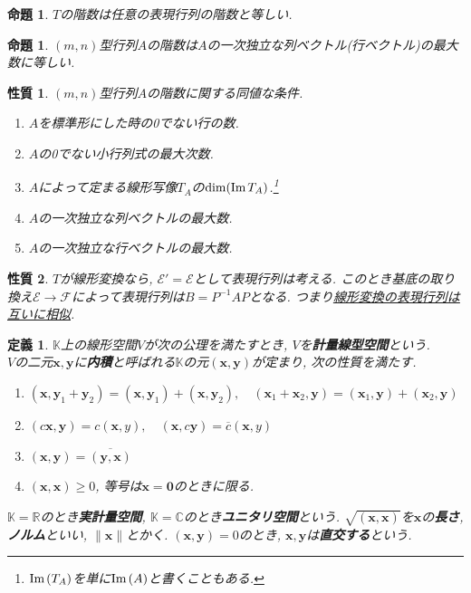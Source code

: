 \documentclass[a4j,dvipdfmx]{jsarticle}
\newcommand{\R}{\mathbb{R}}
\newcommand{\C}{\mathbb{C}}
\newcommand{\K}{\mathbb{K}}
\newcommand{\E}{\mathcal{E}}
\newcommand{\F}{\mathcal{F}}
\renewcommand{\Im}{\mathrm{Im}\hspace{0.5mm}}
\theoremstyle{mystyle}
\newtheorem*{definition}{定義}
\newtheorem{proposition}[theorem]{命題}
\newtheorem*{property}{性質}
\begin{document}
    \begin{proposition}
        $T$の階数は任意の表現行列の階数と等しい.
    \end{proposition}
    \begin{proposition}
        $(m,n)$型行列$A$の階数は$A$の一次独立な列ベクトル(行ベクトル)の最大数に等しい.
    \end{proposition}
    \begin{property}
        $(m,n)$型行列$A$の階数に関する同値な条件.
        \begin{enumerate}
            \item $A$を標準形にした時の0でない行の数.
            \item $A$の0でない小行列式の最大次数.
            \item $A$によって定まる線形写像$T_A$の$\dim(\Im T_A)$.\footnote{$\Im (T_A)$を単に$\Im(A)$と書くこともある.}
            \item $A$の一次独立な列ベクトルの最大数.
            \item $A$の一次独立な行ベクトルの最大数.
        \end{enumerate}
    \end{property}
    \begin{property}
        $T$が線形変換なら, $\E' = \E$として表現行列は考える. このとき基底の取り換え$\E\to \F$によって表現行列は$B=P^{-1}AP$となる. つまり\underline{線形変換の表現行列は互いに相似}.
    \end{property}
    \clearpage
    \begin{definition}
        $\K$上の線形空間$V$が次の公理を満たすとき, $V$を\textbf{計量線型空間}という.\\
        $V$の二元$\bm{x},\bm{y}$に\textbf{内積}と呼ばれる$\K$の元$(\bm{x},\bm{y})$が定まり, 次の性質を満たす.
        \begin{enumerate}
            \item $(\bm{x},\bm{y}_1+\bm{y}_2)=(\bm{x},\bm{y}_1)+(\bm{x},\bm{y}_2),\quad (\bm{x}_1+\bm{x}_2,\bm{y})=(\bm{x}_1,\bm{y})+(\bm{x}_2,\bm{y})$
            \item $(c\bm{x},\bm{y})=c(\bm{x},y),\quad (\bm{x},c\bm{y})=\overline{c}(\bm{x},y)$
            \item $(\bm{x},\bm{y})=\overline{(\bm{y},\bm{x})}$
            \item $(\bm{x,x})\geq 0$, 等号は$\bm{x}=\bm{0}$のときに限る.
        \end{enumerate}
        $\K=\R$のとき\textbf{実計量空間}, $\K=\C$のとき\textbf{ユニタリ空間}という. $\sqrt{(\bm{x},\bm{x})}$を$\bm{x}$の\textbf{長さ}, \textbf{ノルム}といい, $\|\bm{x}\|$とかく.
        $(\bm{x},\bm{y})=0$のとき, $\bm{x},\bm{y}$は\textbf{直交する}という.
    \end{definition}
\end{document}
